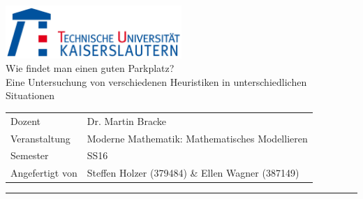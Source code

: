 \begin{titlepage}
{\centering
\includegraphics[width=0.5\textwidth]{pics/tu-logo}\\
}
{\huge\centering
Wie findet man einen guten Parkplatz?\\
\noindent\large
Eine Untersuchung von verschiedenen Heuristiken in unterschiedlichen Situationen\\[1cm]
}
\begin{tabular}{ll}
Dozent&Dr. Martin Bracke\\
Veranstaltung&Moderne Mathematik: Mathematisches Modellieren\\
Semester& SS16\\
Angefertigt von&Steffen Holzer (379484) \& Ellen Wagner (387149)
\end{tabular}
\hrule
\tableofcontents
\pagestyle{empty}
\end{titlepage}